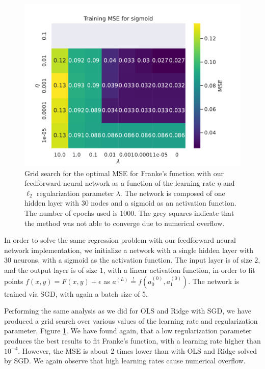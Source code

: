 \documentclass[aps,reprint,superscriptaddress,nofootinbib]{revtex4-2}
\begin{document}
\begin{figure}[h!]
    \centering
    \includegraphics[width=\linewidth]{figures/part_b/1_grid_search_sigmoid.pdf}
    \caption{Grid search for the optimal MSE for Franke's function with our feedforward neural network as a function of the learning rate \(\eta\) and \(\ell_2\) regularization parameter \(\lambda\). The network is composed of one hidden layer with 30 nodes and a sigmoid as an activation function. The number of epochs used is \(1000\). The grey squares indicate that the method was not able to converge due to numerical overflow.
    }
    \label{fig:nn_grid_mse_lmd_eta_sigmoid}
\end{figure}

In order to solve the same regression problem with our feedforward neural network implementation, we initialize a network with a single hidden layer with 30 neurons, with a sigmoid as the activation function. The input layer is of size \(2\), and the output layer is of size \(1\), with a linear activation function, in order to fit points \(f(x, y) = F(x, y) + \epsilon\) as \(a^{(L)} \overset{!}{=} f (a^{(0)}_0, a^{(0)}_1 )\). The network is trained via SGD, with again a batch size of 5.

Performing the same analysis as we did for OLS and Ridge with SGD, we have produced a grid search over various values of the learning rate and regularization parameter, Figure \ref{fig:nn_grid_mse_lmd_eta_sigmoid}. We have found again, that a low regularization parameter produces the best results to fit Franke's function, with a learning rate higher than \(10^{-4}\). However, the MSE is about 2 times lower than with OLS and Ridge solved by SGD. We again observe that high learning rates cause numerical overflow.
\end{document}
